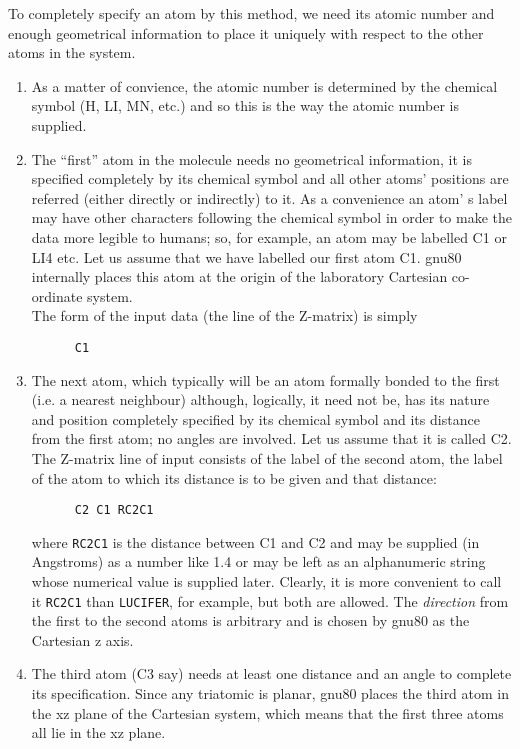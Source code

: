 To completely specify an atom by this method, we need its atomic
number and enough geometrical information to place it uniquely
with respect to the other atoms in the system. 
\begin{enumerate}
\item As a matter of convience,
the atomic number is determined by the chemical symbol (H, LI, MN, etc.)
and so this is the way the atomic number is supplied.
\item The ``first'' atom in the molecule needs no geometrical
information, it is specified completely by its chemical symbol and all
other atoms' positions are referred (either directly or indirectly)
to it. As a convenience an atom' s label may have other characters
following the chemical symbol in order to make the data more legible to
humans; so, for example, an atom may be labelled C1 or LI4 etc.
Let us assume that we have labelled our first atom C1. gnu80
internally places this atom at the origin of the laboratory Cartesian
co-ordinate system. \\
The form of the input data (the line of the Z-matrix) is simply
\begin{verbatim}
      C1
\end{verbatim}
\item The next atom, which typically will be an atom formally bonded
to the first (i.e. a nearest neighbour) although, logically, it need not
be, has its nature and position completely specified by its chemical
symbol and its distance from the first atom; no angles are involved.
Let us assume that it is called C2. \\
The Z-matrix line of input consists of the label of the second atom,
the label of the atom to which its distance is to be given and that distance:
\begin{verbatim}
      C2 C1 RC2C1
\end{verbatim}
where {\tt RC2C1} is the distance between C1 and C2 and may be supplied
(in Angstroms) as a number like 1.4 or may be left as an alphanumeric
string whose numerical value is supplied later. Clearly, it is more
convenient to call it {\tt RC2C1} than {\tt LUCIFER}, for example,
but both are allowed.
The {\em direction} from the first to the second atoms is arbitrary and
is chosen by gnu80 as the Cartesian z axis.
\item The third atom (C3 say) needs at least one distance and an angle
to complete its specification. Since any triatomic is planar, gnu80
places the third atom in the xz plane of the Cartesian system, which
means that the first three atoms all lie in the xz plane.

\end{enumerate}
